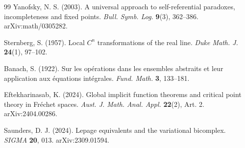 \documentclass[12pt,a4paper]{article}
\theoremstyle{definition}
\begin{document}
\begin{thebibliography}{99}
Yanofsky, N. S. (2003). A universal approach to self-referential paradoxes, incompleteness and fixed points. \emph{Bull. Symb. Log.} \textbf{9}(3), 362--386. arXiv:math/0305282.

Sternberg, S. (1957). Local $C^n$ transformations of the real line. \emph{Duke Math. J.} \textbf{24}(1), 97--102.

Banach, S. (1922). Sur les op\'erations dans les ensembles abstraits et leur application aux \'equations int\'egrales. \emph{Fund. Math.} \textbf{3}, 133--181.

Eftekharinasab, K. (2024). Global implicit function theorems and critical point theory in Fr\'echet spaces. \emph{Aust. J. Math. Anal. Appl.} \textbf{22}(2), Art. 2. arXiv:2404.00286.

Saunders, D. J. (2024). Lepage equivalents and the variational bicomplex. \emph{SIGMA} \textbf{20}, 013. arXiv:2309.01594.

\end{thebibliography}
\end{document}
